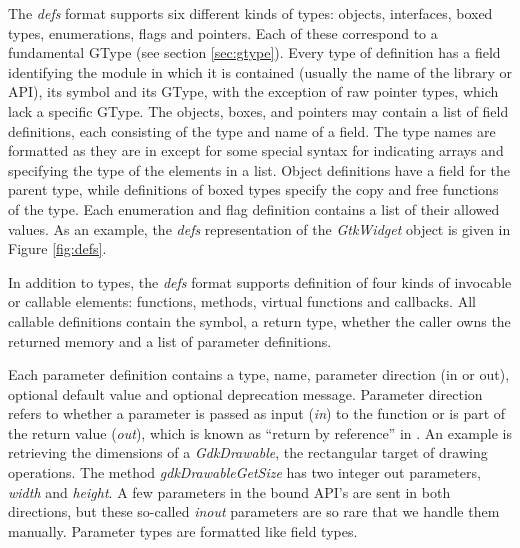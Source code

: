 \documentclass[article]{jss}
\begin{document}
The \emph{defs} format supports six different kinds of types: objects,
interfaces, boxed types, enumerations, flags and pointers. Each of
these correspond to a fundamental GType (see section \ref{sec:gtype}). 
Every type of definition has
a field identifying the module in which it is contained (usually the
name of the library or API), its  symbol and its GType,
with the exception of raw pointer types, which lack a specific
GType. The objects, boxes, and pointers may contain a list of field
definitions, each consisting of the type and name of a field. The type
names are formatted as they are in  except for some
special syntax for indicating arrays and specifying the type of the
elements in a list. Object definitions have a field for the parent
type, while definitions of boxed types specify the copy and free
functions of the type.  Each enumeration and flag definition contains
a list of their allowed values.  As an example, the \emph{defs}
representation of the \emph{GtkWidget} object is given in Figure \ref{fig:defs}. 

In addition to types, the \emph{defs} format supports definition of
four kinds of invocable or callable elements: functions, methods, virtual functions and
callbacks. All callable definitions contain the  symbol, a
return type, whether the caller owns the returned memory and a list of
parameter definitions.

Each parameter definition contains a type,
name, parameter
direction (in or out),
optional default value and optional deprecation
message. Parameter direction refers to whether a parameter is passed as input (\emph{in}) to the function or is part of the return value (\emph{out}), which is known as ``return by reference'' in . An example is retrieving the dimensions of a \emph{GdkDrawable}, the rectangular target of  drawing operations. The method \emph{gdkDrawableGetSize} has two integer out parameters, \emph{width} and \emph{height}. A few parameters in the bound API's are sent in both directions, but these so-called \emph{inout} parameters are so rare that we handle them manually. Parameter types are formatted like field types. 
\end{document}
